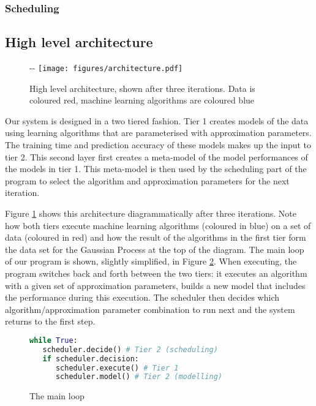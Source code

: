 \documentclass[a4paper,12pt,twoside,openright]{report}
\begin{document}
\subsubsection{Scheduling}


\subsection{High level architecture}
\begin{figure}[!ht]
  \begin{adjustwidth}{-\oddsidemargin-2in}{-\rightmargin-1.5in}
    \centering
    \texttt{[image: figures/architecture.pdf]}
    
  \end{adjustwidth}
  \caption{High level architecture, shown after three iterations. Data is coloured red, machine learning algorithms are coloured blue}
    \label{architecture}
\end{figure}

Our system is designed in a two tiered fashion. Tier 1 creates models of the data using learning algorithms that are parameterised with approximation parameters. The training time and prediction accuracy of these models makes up the input to tier 2. This second layer first creates a meta-model of the model performances of the models in tier 1. This meta-model is then used by the scheduling part of the program to select the algorithm and approximation parameters for the next iteration. 

Figure \ref{architecture} shows this architecture diagrammatically after three iterations. Note how both tiers execute machine learning algorithms (coloured in blue) on a set of data (coloured in red) and how the result of the algorithms in the first tier form the data set for the Gaussian Process at the top of the diagram. The main loop of our program is shown, slightly simplified, in Figure \ref{mainloop}. When executing, the program switches back and forth between the two tiers: it executes an algorithm with a given set of approximation parameters, builds a new model that includes the performance during this execution. The scheduler then decides which algorithm/approximation parameter combination to run next and the system returns to the first step.

\begin{figure}[ht]
\begin{lstlisting}[language=Python]
while True:
   scheduler.decide() # Tier 2 (scheduling)
   if scheduler.decision:
      scheduler.execute() # Tier 1
      scheduler.model() # Tier 2 (modelling)
\end{lstlisting}
\caption{The main loop}
\label{mainloop}
\end{figure}
\end{document}
